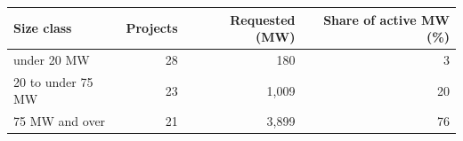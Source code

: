 \begin{tabular}{lrrr}
\toprule
Size class & Projects & Requested (MW) & Share of active MW (\%) \\
\midrule
under 20 MW & 28 & 180 & 3 \\
20 to under 75 MW & 23 & 1,009 & 20 \\
75 MW and over & 21 & 3,899 & 76 \\
\bottomrule
\end{tabular}